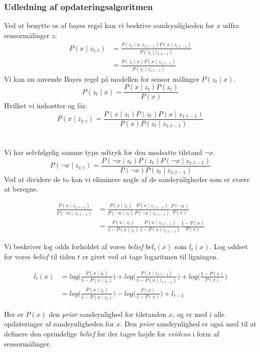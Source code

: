 \subsubsection{Udledning af opdateringsalgoritmen}
Ved at benytte os af bayes regel kan vi beskrive sandsynligheden for $x$ udfra sensormålinger $z$.
\begin{align}
	P(x \mid z_{1:t}) &= \frac{P(z_t \mid x, z_{1:t-1}) P(x \mid z_{1:t-1})}{P(z_t \mid z_{1:t-1})} \\
	&= \frac{P(z_t \mid x) P(x \mid z_{1:t-1})}{P(z_t \mid z_{1:t-1})}
\end{align}
Vi kan nu anvende Bayes regel på modellen for sensor målinger $P(z_t \mid x)$.
$$P(z_t \mid x) = \frac{P(x \mid z_t) P(z_t)}{P(x)}$$
Hvilket vi indsætter og får.
$$P(x \mid z_{1:t}) = \frac{P(x \mid z_t) P(z_t) P(x \mid z_{1:t-1})}{P(x) P(z_t \mid z_{1:t-1})}$$ \\
\cite[s. 95]{probabilisticRobotics} \\

Vi har selvfølgelig samme type udtryk for den modsatte tilstand $\neg x$.
$$P(\neg x \mid z_{1:t}) = \frac{P(\neg x \mid z_t) P(z_t) P(\neg x \mid z_{1:t-1})}{P(\neg x) P(z_t \mid z_{1:t-1})}$$
Ved at dividere de to kan vi eliminere nogle af de sandsynligheder som er svære at beregne.

\begin{align}
	\frac{P(x \mid z_{1:t-1})}{P(\neg x \mid z_{1:t-1})} 
	&= \frac{P(x \mid z_t)}{P(\neg x \mid z_t)} \frac{P(x \mid z_{1:t-1})}{P(\neg x \mid z_{1:t-1})} \frac{P(\neg x)}{P(x)} \\
	&= \frac{P(x \mid z_t)}{1-P(x \mid z_t)} \frac{P(x \mid z_{1:t-1})}{1-P(x \mid z_{1:t-1})} \frac{1-P(x)}{P(x)}
\end{align}

Vi beskriver log odds forholdet af vores \textit{belief} $bel_t(x)$ som $l_t(x)$. 
Log oddset for vores \textit{belief} til tiden $t$ er givet ved at tage logaritmen til ligningen. 

\begin{align}
	l_t(x) &= log\Bigg(\frac{P(x \mid z_t)}{1-P(x \mid z_t)}\Bigg) 
	+ log\Bigg(\frac{P(x \mid z_{1:t-1})}{1-P(x \mid z_{1:t-1})}\Bigg) + log\Bigg(\frac{1-P(x)}{P(x)}\Bigg) \\
	&= log\Bigg(\frac{P(x \mid z_t)}{1-P(x \mid z_t)}\Bigg) - log\Bigg(\frac{P(x)}{1-P(x)}\Bigg) + l_{t-1} 
\end{align}

Her er $P(x)$ den \textit{prior} sandsynlighed for tilstanden $x$, og er med i alle opdateringer af
sandsynligheden for $x$. Den \textit{prior} sandsynlighed er også med til at definere den oprindelige
\textit{belief} før der tages højde for \textit{evidens} i form af sensormålinger.

